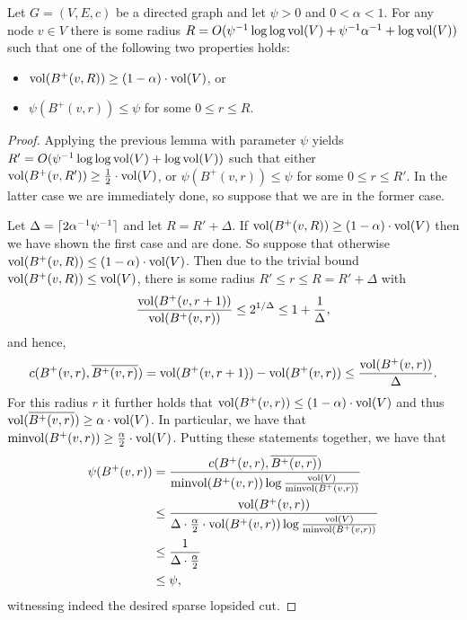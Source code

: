 \documentclass[letterpaper,11pt]{article}
\begin{document}
\begin{lemma} \label{lem:lopsided-expansion-boosted}
Let $G = (V, E, c)$ be a directed graph and let $\psi > 0$ and $0 < \alpha < 1$. For any node $v \in V$ there is some radius $R = O(\psi^{-1} \log\log \operatorname{vol}(V) + \psi^{-1} \alpha^{-1} + \log \operatorname{vol}(V))$ such that one of the following two properties holds:
\begin{itemize}
	\item $\operatorname{vol}(B^+(v, R)) \geq (1 - \alpha) \cdot \operatorname{vol}(V)$, or
	\item $\psi(B^+(v, r)) \leq \psi$ for some $0 \leq r \leq R$.
\end{itemize}
\end{lemma}
\begin{proof}
Applying the previous lemma with parameter $\psi$ yields $R' = O(\psi^{-1} \log\log \operatorname{vol}(V) + \log \operatorname{vol}(V))$ such that either $\operatorname{vol}(B^+(v, R')) \geq \frac{1}{2} \cdot \operatorname{vol}(V)$, or $\psi(B^+(v, r)) \leq \psi$ for some $0 \leq r \leq R'$. In the latter case we are immediately done, so suppose that we are in the former case.

Let $\Delta = \lceil2 \alpha^{-1} \psi^{-1}\rceil$ and let $R = R' + \Delta$. If $\operatorname{vol}(B^+(v, R)) \geq (1 - \alpha) \cdot \operatorname{vol}(V)$ then we have shown the first case and are done. So suppose that otherwise $\operatorname{vol}(B^+(v, R)) \leq (1 - \alpha) \cdot \operatorname{vol}(V)$. Then due to the trivial bound $\operatorname{vol}(B^+(v, R)) \leq \operatorname{vol}(V)$, there is some radius $R' \leq r \leq R = R' + \Delta$ with
\begin{equation*}
	\frac{\operatorname{vol}(B^+(v, r + 1))}{\operatorname{vol}(B^+(v, r))} \leq 2^{1/\Delta} \leq 1 + \frac{1}{\Delta},
\end{equation*}
and hence,
\begin{equation*}
	c(B^+(v, r), \overline{B^+(v, r)}) = \operatorname{vol}(B^+(v, r + 1)) - \operatorname{vol}(B^+(v, r)) \leq \frac{\operatorname{vol}(B^+(v, r))}{\Delta}.
\end{equation*}
For this radius $r$ it further holds that $\operatorname{vol}(B^+(v, r)) \leq (1 - \alpha) \cdot \operatorname{vol}(V)$ and thus $\operatorname{vol}(\overline{B^+(v, r)}) \geq \alpha \cdot \operatorname{vol}(V)$. In particular, we have that $\operatorname{minvol}(B^+(v, r)) \geq \frac{\alpha}{2} \cdot \operatorname{vol}(V)$. Putting these statements together, we have that
\begin{align*}
	\psi(B^+(v, r))
	&= \frac{c(B^+(v, r), \overline{B^+(v, r)})}{\operatorname{minvol}(B^+(v, r)) \log \frac{\operatorname{vol}(V)}{\operatorname{minvol}(B^+(v, r))}} \\
	&\leq \frac{\operatorname{vol}(B^+(v, r))}{\Delta \cdot \frac{\alpha}{2} \cdot \operatorname{vol}(B^+(v, r)) \log \frac{\operatorname{vol}(V)}{\operatorname{minvol}(B^+(v, r))}} \\
	&\leq \frac{1}{\Delta \cdot \frac{\alpha}{2}} \\
	&\leq \psi,
\end{align*}
witnessing indeed the desired sparse lopsided cut.
\end{proof}
\end{document}
